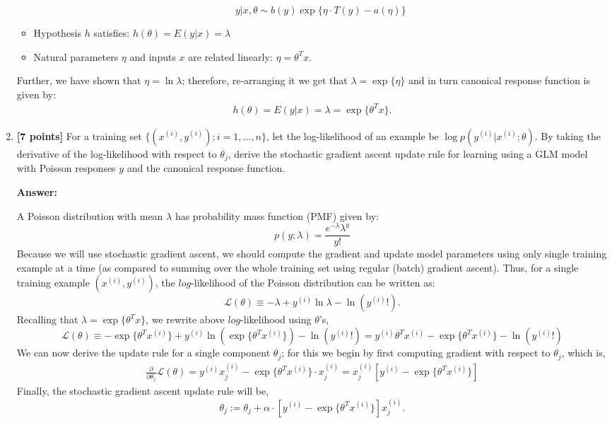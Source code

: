 \documentclass{article}
\begin{document}
\begin{enumerate}[label=\alph*)]
\begin{itemize}
\[y|x,\theta \sim b(y) \exp\{\eta\cdot  T(y) - a(\eta)\}\]

\item Hypothesis $h$
satisfies: $h(\theta) = E(y|x) = \lambda$
\item Natural parameters $\eta$ and inputs $x$ are related linearly: $\eta = \theta^Tx$.
\end{itemize}
Further, we have shown that $\eta = \ln\lambda$; therefore, re-arranging it we get that $\lambda = \exp\{\eta\}$ and in turn canonical response function is given by: 
\begin{align*}
    h(\theta) = E(y|x) = \boxed{\lambda = \exp\{\theta^Tx\}.}
\end{align*}





\item \textbf{[7 points]} For a training set $\{(x^{(i)}, y^{(i)}); i = 1, \ldots, n\}$, let the log-likelihood of an example be $\log p(y^{(i)}|x^{(i)}; \theta)$. By taking the derivative of the log-likelihood with respect to $\theta_j$, derive the stochastic gradient ascent update rule for learning using a GLM model with Poisson responses $y$ and the canonical response function.

\textbf{Answer:}

A Poisson distribution with mean $\lambda$ has probability mass function (PMF) given by:
\[
p(y;\lambda) = \frac{e^{-\lambda} \lambda^y}{y!}
\]
Because we will use stochastic gradient ascent, we should compute the gradient and update model parameters using only single training example at a time (as compared to summing over the whole training set using regular (batch) gradient ascent).
Thus, for a single training example $(x^{(i)}, y^{(i)})$, the $log$-likelihood of the Poisson distribution can be written as:
\[
\mathscr{L}(\theta) \equiv -\lambda + y^{(i)}\ln\lambda - \ln (y^{(i)}!).
\]
Recalling that $ \lambda = \exp\{\theta^Tx\}$, we rewrite above $log$-likelihood using $\theta$'s,
\[
\mathscr{L}(\theta) \equiv -\exp\{\theta^Tx^{(i)}\} + y^{(i)}\ln(\exp\{\theta^Tx^{(i)}\}) - \ln (y^{(i)}!) = y^{(i)}\theta^Tx^{(i)}  -\exp\{\theta^Tx^{(i)}\}- \ln (y^{(i)}!)
\]
We can now derive the update rule for a single component $\theta_j$; for this we begin by first computing gradient with respect to $\theta_j$, which is,
\begin{align*}
    \frac{\partial}{\partial \theta_j}\mathscr{L}(\theta) =  y^{(i)}x^{(i)}_j -\exp\{\theta^Tx^{(i)}\}\cdot x^{(i)}_j = x^{(i)}_j\left[y^{(i)} - \exp\{\theta^Tx^{(i)}\}\right]
\end{align*}
Finally, the stochastic gradient ascent update rule will be,
\[
\boxed{\theta_j := \theta_j + \alpha\cdot \left[y^{(i)} - \exp\{\theta^Tx^{(i)}\}\right]x^{(i)}_j.}
\]



\end{enumerate}
\end{document}
